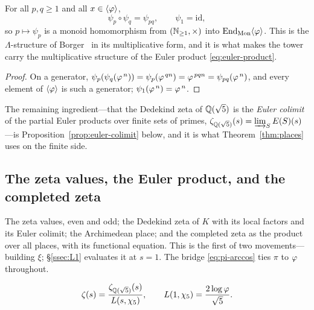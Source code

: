 \begin{proposition}\label{prop:psi-functorial}
For all $p,q\ge1$ and all $x\in\langle\varphi\rangle$,
\begin{equation}\label{eq:psi-functorial}
  \psi_p\circ\psi_q=\psi_{pq},\qquad \psi_1=\mathrm{id},
\end{equation}
so $p\mapsto\psi_p$ is a monoid homomorphism from $(\mathbb{N}_{\ge1},\times)$ into
$\mathrm{End}_{\mathrm{Mon}}\langle\varphi\rangle$. This is the $\Lambda$-structure of
Borger~\cite{Borger} in its multiplicative form, and it is what makes the tower carry the
multiplicative structure of the Euler product \eqref{eq:euler-product}.

\end{proposition}
\begin{proof}
On a generator, $\psi_p(\psi_q(\varphi^{\,n}))=\psi_p(\varphi^{\,qn})=\varphi^{\,pqn}=\psi_{pq}(\varphi^{\,n})$,
and every element of $\langle\varphi\rangle$ is such a generator; $\psi_1(\varphi^{\,n})=\varphi^{\,n}$.
\end{proof}

The remaining ingredient---that the Dedekind zeta of $\mathbb{Q}(\sqrt5)$ is the \emph{Euler colimit} of
the partial Euler products over finite sets of primes,
$\zeta_{\mathbb{Q}(\sqrt5)}(s)=\varinjlim_{S}E(S)(s)$---is Proposition~\ref{prop:euler-colimit} below, and it is what
Theorem~\ref{thm:places} uses on the finite side.

\subsection{The zeta values, the Euler product, and the completed zeta}\label{ssec:zeta}

The zeta values, even and odd; the Dedekind zeta of $K$ with its local factors and its Euler
colimit; the Archimedean place; and the completed zeta as the product over all places, with its
functional equation. This is the first of two movements---building $\xi$; \S\ref{ssec:L1}
evaluates it at $s=1$. The bridge \eqref{eq:pi-arccos} ties $\pi$ to $\varphi$ throughout.

\begin{equation}\label{eq:dedekind}
\zeta(s)=\frac{\zeta_{\mathbb{Q}(\sqrt5)}(s)}{L(s,\chi_5)},\qquad
L(1,\chi_5)=\frac{2\log\varphi}{\sqrt5}.
\end{equation}

